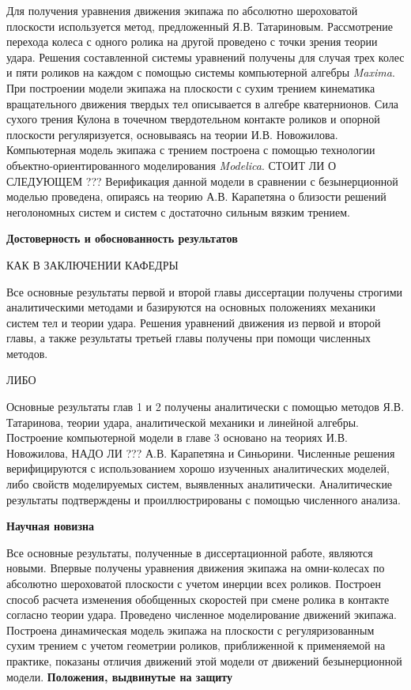 Для получения уравнения движения экипажа по абсолютно шероховатой плоскости используется метод, предложенный Я.В. Татариновым. Рассмотрение перехода колеса с одного ролика на другой проведено с точки зрения теории удара. Решения составленной системы уравнений получены для случая трех колес и пяти роликов на каждом с помощью системы компьютерной алгебры \textit{Maxima}. При построении модели экипажа на плоскости с сухим трением кинематика вращательного движения твердых тел описывается в алгебре кватернионов. Сила сухого трения Кулона в точечном твердотельном контакте роликов и опорной плоскости регуляризуется, основываясь на теории И.В. Новожилова. Компьютерная модель экипажа с трением построена с помощью технологии объектно-ориентированного моделирования \textit{Modelica}. СТОИТ ЛИ О СЛЕДУЮЩЕМ ??? Верификация данной модели в сравнении с безынерционной моделью проведена, опираясь на теорию А.В. Карапетяна о близости решений неголономных систем и систем с достаточно сильным вязким трением.

\textbf{Достоверность и обоснованность результатов}

КАК В ЗАКЛЮЧЕНИИ КАФЕДРЫ

Все основные результаты первой и второй главы диссертации получены строгими аналитическими методами и базируются на основных положениях механики систем тел и теории удара. Решения уравнений движения из первой и второй главы, а также результаты третьей главы получены при помощи численных методов.

ЛИБО

Основные результаты глав 1 и 2 получены аналитически с помощью методов Я.В. Татаринова, теории удара, аналитической механики и линейной алгебры. Построение компьютерной модели в главе 3 основано на теориях И.В. Новожилова, НАДО ЛИ ??? А.В. Карапетяна и Синьорини. Численные решения верифицируются с использованием хорошо изученных аналитических моделей, либо свойств моделируемых систем, выявленных аналитически. Аналитические результаты подтверждены и проиллюстрированы с помощью численного анализа.

\textbf{Научная новизна}

Все основные результаты, полученные в диссертационной  работе, являются новыми. Впервые получены уравнения движения экипажа на омни-колесах по абсолютно шероховатой плоскости с учетом инерции всех роликов. Построен способ расчета изменения обобщенных скоростей при смене ролика в контакте согласно теории удара. Проведено численное моделирование движений экипажа. Построена динамическая модель экипажа на плоскости с регуляризованным сухим трением с учетом геометрии роликов, приближенной к применяемой на практике, показаны отличия движений этой модели от движений безынерционной модели.
\textbf{Положения, выдвинутые на защиту}

